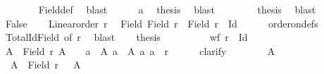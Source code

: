 \begin{isabellebody}
\ \ \ \ \ \ \isamarkupfalse%
\ Field{\isacharunderscore}{\kern0pt}def\ \isamarkupfalse%
\ blast\isanewline
\ \ \ \ \isamarkupfalse%
\ a\ \isamarkupfalse%
\ {\isacharquery}{\kern0pt}thesis\ \isamarkupfalse%
\ blast\isanewline
\ \ \isamarkupfalse%
\isanewline
\ \ \isamarkupfalse%
\ \isamarkupfalse%
\ {\isacharquery}{\kern0pt}thesis\ \isamarkupfalse%
\ blast\isanewline
{}\isamarkupfalse%
\isanewline
\ \ \isamarkupfalse%
\ False\isanewline
\ \ \isamarkupfalse%
\ {\isacartoucheopen}Linear{\isacharunderscore}{\kern0pt}order\ r{\isacartoucheclose}\ \isamarkupfalse%
\ Field{\isacharcolon}{\kern0pt}\ {\isachardoublequoteopen}Field\ r\ {\isacharequal}{\kern0pt}\ Field\ {\isacharparenleft}{\kern0pt}r\ {\isacharminus}{\kern0pt}\ Id{\isacharparenright}{\kern0pt}{\isachardoublequoteclose}\isanewline
\ \ \ \ \isamarkupfalse%
\ order{\isacharunderscore}{\kern0pt}on{\isacharunderscore}{\kern0pt}defs\ \isamarkupfalse%
\ Total{\isacharunderscore}{\kern0pt}Id{\isacharunderscore}{\kern0pt}Field\ {\isacharbrackleft}{\kern0pt}of\ r{\isacharbrackright}{\kern0pt}\ \isamarkupfalse%
\ blast\isanewline
\ \ \isamarkupfalse%
\ {\isacharquery}{\kern0pt}thesis\isanewline
\ \ \isamarkupfalse%
\isanewline
\ \ \ \ \isamarkupfalse%
\ {\isacharasterisk}{\kern0pt}{\isacharcolon}{\kern0pt}\ {\isachardoublequoteopen}wf\ {\isacharparenleft}{\kern0pt}r\ {\isacharminus}{\kern0pt}\ Id{\isacharparenright}{\kern0pt}{\isachardoublequoteclose}\isanewline
\ \ \ \ \isamarkupfalse%
\ {\isachardoublequoteopen}{\isasymforall}A\ {\isasymsubseteq}\ Field\ r{\isachardot}{\kern0pt}\ A\ {\isasymnoteq}\ {\isacharbraceleft}{\kern0pt}{\isacharbraceright}{\kern0pt}\ {\isasymlongrightarrow}\ {\isacharparenleft}{\kern0pt}{\isasymexists}a\ {\isasymin}\ A{\isachardot}{\kern0pt}\ {\isasymforall}a{\isacharprime}{\kern0pt}\ {\isasymin}\ A{\isachardot}{\kern0pt}\ {\isacharparenleft}{\kern0pt}a{\isacharcomma}{\kern0pt}\ a{\isacharprime}{\kern0pt}{\isacharparenright}{\kern0pt}\ {\isasymin}\ r{\isacharparenright}{\kern0pt}{\isachardoublequoteclose}\isanewline
\ \ \ \ \isamarkupfalse%
\ clarify\isanewline
\ \ \ \ \ \ \isamarkupfalse%
\ A\isanewline
\ \ \ \ \ \ \isamarkupfalse%
\ {\isacharasterisk}{\kern0pt}{\isacharasterisk}{\kern0pt}{\isacharcolon}{\kern0pt}\ {\isachardoublequoteopen}A\ {\isasymsubseteq}\ Field\ r{\isachardoublequoteclose}\ \ {\isacharasterisk}{\kern0pt}{\isacharasterisk}{\kern0pt}{\isacharasterisk}{\kern0pt}{\isacharcolon}{\kern0pt}\ {\isachardoublequoteopen}A\ {\isasymnoteq}\ {\isacharbraceleft}{\kern0pt}{\isacharbraceright}{\kern0pt}{\isachardoublequoteclose}\isanewline

\end{isabellebody}
